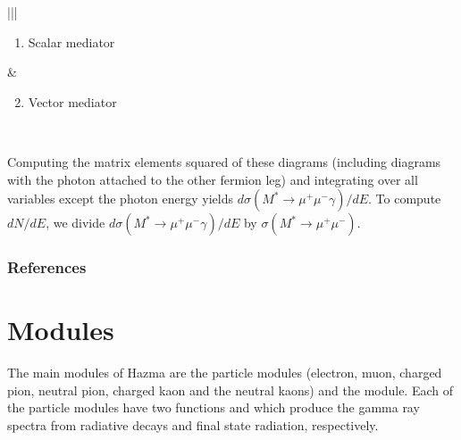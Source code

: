 \documentclass[letterpaper,10pt,english]{sphinxmanual}
\let\sphinxpxdimen\pdfpxdimen\else\newdimen\sphinxpxdimen
\begin{document}
\begin{savenotes}\sphinxattablestart
\centering
\begin{tabular}[t]{|*{2}{|}}
\hline
\begin{sphinxfigure-in-table}
\centering

\noindent{}
\end{sphinxfigure-in-table}\relax
\begin{enumerate}
\item {} 
Scalar mediator

\end{enumerate}
&\begin{sphinxfigure-in-table}
\centering

\noindent{}
\end{sphinxfigure-in-table}\relax
\begin{enumerate}
\setcounter{enumi}{1}
\item {} 
Vector mediator

\end{enumerate}
\\
\hline
\end{tabular}
\par
\sphinxattableend\end{savenotes}

Computing the matrix elements squared of these diagrams (including diagrams with the photon attached to the other fermion leg) and integrating over all variables except the photon energy yields \(d\sigma(M^*\to\mu^{+}\mu^{-}\gamma)/dE\). To compute \(dN/dE\), we divide \(d\sigma(M^*\to\mu^{+}\mu^{-}\gamma)/dE\) by \(\sigma(M^*\to\mu^{+}\mu^{-})\).

\noindent{\hspace*{\fill}\sphinxincludegraphics[width=800\sphinxpxdimen,height=800\sphinxpxdimen]{{muon_fsr}.png}\hspace*{\fill}}


\subsection{References}
\label{\detokenize{description:references}}

\chapter{Modules}
\label{\detokenize{modules:modules}}\label{\detokenize{modules::doc}}
The main modules of Hazma are the particle modules (electron, muon, charged pion, neutral pion, charged kaon and the neutral kaons) and the  module. Each of the particle modules have two functions  and  which produce the gamma ray spectra from radiative decays and final state radiation, respectively.
\end{document}
